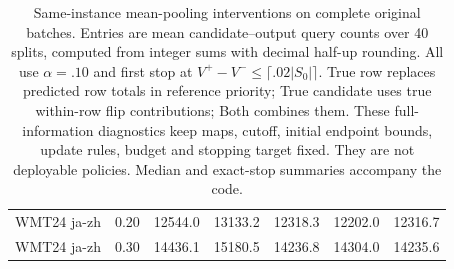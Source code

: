 \begin{table}[t]
\begin{tabular}{lrrrrrr}
WMT24 ja-zh & 0.20 & 12544.0 & 13133.2 & 12318.3 & 12202.0 & 12316.7 \\
WMT24 ja-zh & 0.30 & 14436.1 & 15180.5 & 14236.8 & 14304.0 & 14235.6 \\
\bottomrule
\end{tabular}
\caption{Same-instance mean-pooling interventions on complete original batches. Entries are mean candidate--output query counts over 40 splits, computed from integer sums with decimal half-up rounding. All use $\alpha=.10$ and first stop at $V^+-V^-\le\lceil .02|S_0|\rceil$. True row replaces predicted row totals in reference priority; True candidate uses true within-row flip contributions; Both combines them. These full-information diagnostics keep maps, cutoff, initial endpoint bounds, update rules, budget and stopping target fixed. They are not deployable policies. Median and exact-stop summaries accompany the code.}
\label{tab:query-interventions}
\end{table}
